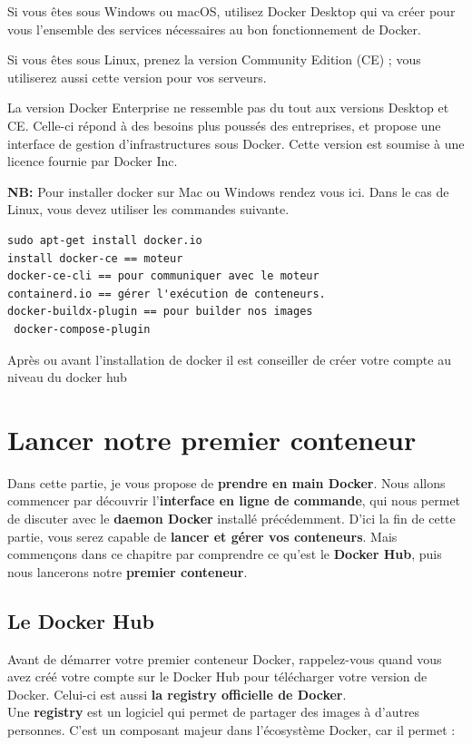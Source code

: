 \documentclass[12pt,a4paper]{article}
\begin{document}
Si vous êtes sous Windows ou macOS, utilisez Docker Desktop qui va créer pour vous l'ensemble des services nécessaires au bon fonctionnement de Docker.

Si vous êtes sous Linux, prenez la version Community Edition (CE) ; vous utiliserez aussi cette version pour vos serveurs.

La version Docker Enterprise ne ressemble pas du tout aux versions Desktop et CE. Celle-ci répond à des besoins plus poussés des entreprises, et propose une interface de gestion d'infrastructures sous Docker. Cette version est soumise à une licence fournie par Docker Inc.

\textbf{NB:} Pour installer docker sur Mac ou Windows rendez vous ici.
Dans le cas de Linux, vous devez utiliser les commandes suivante.
\begin{verbatim}
sudo apt-get install docker.io
install docker-ce == moteur
docker-ce-cli == pour communiquer avec le moteur
containerd.io == gérer l'exécution de conteneurs.
docker-buildx-plugin == pour builder nos images
 docker-compose-plugin
\end{verbatim}

Après ou avant l'installation de docker il est conseiller de créer votre compte au
niveau du docker hub

\section{Lancer notre premier conteneur}
Dans cette partie, je vous propose de \textbf{prendre en main Docker}. Nous allons 
commencer par découvrir l'\textbf{interface en ligne de commande}, qui nous permet
de discuter avec le \textbf{daemon Docker} installé précédemment. D'ici la fin de cette partie, vous serez capable de \textbf{lancer et gérer vos conteneurs}. Mais commençons dans ce chapitre par comprendre ce qu'est le \textbf{Docker Hub}, puis nous lancerons notre \textbf{premier conteneur}.

\subsection{Le Docker Hub}
Avant de démarrer votre premier conteneur Docker, rappelez-vous quand vous avez créé votre compte sur le Docker Hub pour télécharger votre version de Docker. Celui-ci est aussi 
\textbf{la registry officielle de Docker}.\\

Une \textbf{registry} est un logiciel qui permet de partager des images à d'autres personnes. C’est un composant majeur dans l’écosystème Docker, car il permet :
\end{document}
